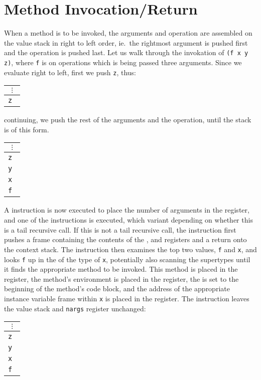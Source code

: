 \newenvironment{stackphoto}{\begin{center}\begin{tabular}{|c|}
$\vdots$\\\hline}{\end{tabular}\end{center}}

\section{Method Invocation/Return}

When a method is to be invoked, the arguments and operation are
assembled on the value stack in right to left order, ie.\ the
rightmost argument is pushed first and the operation is pushed last.
Let us walk through the invokation of \texttt{(f x y z)}, where \texttt{f}
is on operations which is being passed three arguments.  Since we
evaluate right to left, first we push \texttt{z}, thus:
\begin{stackphoto}
\tt z \\\hline
\end{stackphoto}
continuing, we push the rest of the arguments and the operation, until
the stack is of this form.
\begin{stackphoto}
\tt z \\\hline
\tt y \\\hline
\tt x \\\hline
\tt f \\\hline
\end{stackphoto}
A  instruction is now executed to place the number
of arguments in the  register, and one of the 
instructions is executed, which variant depending on whether this is a
tail recursive call.  If this is not a tail recursive call, the
 instruction first pushes a frame containing the contents
of the ,  and  registers
and a return  onto the context stack.  The instruction then
examines the top two values, \texttt{f} and \texttt{x}, and looks \texttt{f} up
in the  of the type of \texttt{x}, potentially
also scanning the supertypes until it finds the appropriate method to
be invoked.  This method is placed in the 
register, the method's environment is placed in the  register,
the  is set to the beginning of the method's code block, and
the address of the appropriate instance variable frame within \texttt{x} is
placed in the  register.  The  instruction leaves
the value stack and \texttt{nargs} register unchanged:
\begin{stackphoto}
\tt z \\\hline
\tt y \\\hline
\tt x \\\hline
\tt f \\\hline
\end{stackphoto}

